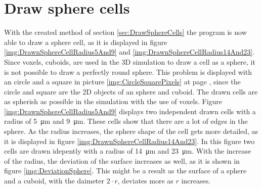 \section{Draw sphere cells}
With the created method of section \ref{sec:DrawSphereCells} the program is now able to draw a sphere cell, as it is displayed in figure \ref{img:DrawnSphereCellRadius5And9} and \ref{img:DrawnSphereCellRadius14And23}. \newline
Since voxels, cuboids, are used in the 3D simulation to draw a cell as a sphere, it is not possible to draw a perfectly round sphere. This problem is displayed with an circle and a square in picture \ref{img:CircleSquarePixels} at page \pageref{img:CircleSquarePixels}, since the circle and square are the 2D objects of an sphere and cuboid. The drawn cells are as spherish as possible in the simulation with the use of voxels. \newline
Figure \ref{img:DrawnSphereCellRadius5And9} displays two independent drawn cells with a radius of \SI{5}{\micro\metre} and \SI{9}{\micro\metre}. These cells show that there are a lot of edges in the sphere. As the radius increases, the sphere shape of the cell gets more detailed, as it is displayed in figure \ref{img:DrawnSphereCellRadius14And23}. In this figure two cells are drawn idepently with a radius of \SI{14}{\micro\metre} and \SI{23}{\micro\metre}. With the increase of the radius, the deviation of the surface increases as well, as it is shown in figure \ref{img:DeviationSphere}. This might be a result as the surface of a sphere and a cuboid, with the daimeter $2 \cdot r$, deviates more as $r$ increases.

